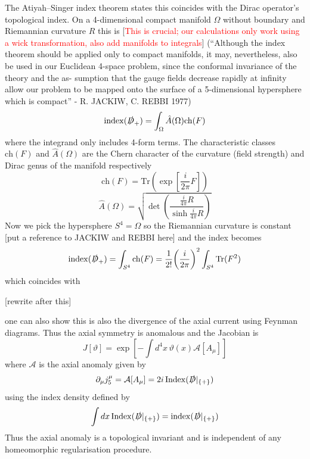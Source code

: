 \documentclass[11pt, a4paper]{article}
\theoremstyle{definition}
\theoremstyle{plain}
\begin{document}
The Atiyah–Singer index theorem states this coincides with the Dirac operator's 
topological index. On a 4-dimensional compact manifold $\Omega$ without boundary and
Riemannian curvature $R$
this is [\textcolor{red}{This is crucial; our 
calculations only work using a wick transformation, also add manifolds to integrals}]
(``Although the index theorem should be applied only
to compact manifolds, it may, nevertheless, also
be used in our Euclidean 4-space problem, since
the conformal invariance of the theory and the as-
sumption that the gauge fields decrease rapidly at
infinity allow our problem to be mapped onto the
surface of a 5-dimensional hypersphere which is
compact'' - R. JACKIW, C. REBBI 1977)
\begin{equation}
  \mathrm{index}(\slashed{D}_+ ) =  \int_{\Omega}{\hat{A}(\Omega)\mathrm{ch}(F)}
\end{equation}
where the integrand only includes 4-form terms. The characteristic classes
$\mathrm{ch}(F)$ and $\hat{A}(\Omega)$ are the Chern character
of the curvature (field strength) and Dirac genus of the manifold respectively
\begin{equation}
  \mathrm{ch}(F) = \mathrm{Tr}\left(\exp{\left[ \frac{i}{2\pi}F \right]}\right)
\end{equation}
\begin{equation}
  \hat{A}(\Omega) = \sqrt{ \det{\left( \frac{ \frac{i}{4\pi}R }{ \sinh{\frac{i}{4\pi}R} } \right) } } 
\end{equation}
Now we pick the hypersphere $S^{4} = \Omega$ so the Riemannian curvature is 
constant [put a reference to JACKIW and REBBI here] and the index becomes
\begin{equation}
  \mathrm{index}(\slashed{D}_+ ) =  \int_{S^4}{\mathrm{ch}(F)}
= \frac{1}{2!}{\left(\frac{i}{2\pi}\right)}^2 \int_{S^4}{\mathrm{Tr}(F^2)}  
\end{equation}
which coincides with 


[rewrite after this]

one can also show this is also the divergence of the axial current using Feynman diagrams.
Thus the axial symmetry is anomalous and the Jacobian is
\begin{equation}
  J[\vartheta] = \exp{\left[-\int{d^4x\,\vartheta(x)\mathcal{A}[A_\mu]}\right]}
\end{equation}
where $\mathcal{A}$ is the axial anomaly given by
\begin{equation}
  \partial_\mu j^\mu_5 = \mathcal{A}[A_\mu] = 2i\,\mathrm{Index}(\slashed{D}|_{\{+\}})
\end{equation}
using the index density defined by
\begin{equation}
  \int{dx\, \mathrm{Index}(\slashed{D}|_{\{+\}})} = \mathrm{index}(\slashed{D}|_{\{+\}})
\end{equation}
Thus the axial anomaly is a topological invariant
and is independent of any homeomorphic regularisation procedure.


\newpage


\end{document}
